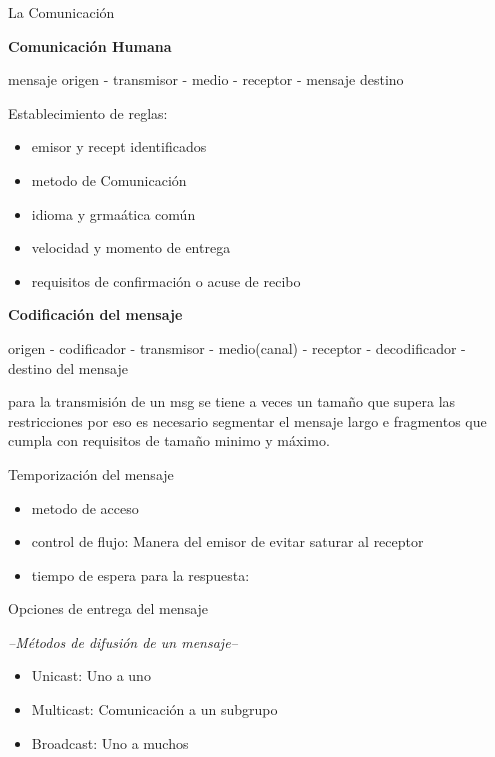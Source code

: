 \documentclass{article}
\begin{document}
\centering
{\Large La Comunicación }
\vspace{1cm}

\textbf{Comunicación Humana}

mensaje origen - transmisor - medio - receptor - mensaje destino \vspace{0.5cm}

\justify
Establecimiento de reglas:
\begin{itemize}
    \item emisor y recept identificados
    \item metodo de Comunicación
    \item idioma y grmaática común
    \item velocidad y momento de entrega
    \item requisitos de confirmación o acuse de recibo
\end{itemize}
\vspace{0.5cm}

\centering
\textbf{Codificación del mensaje}

origen - codificador - transmisor - medio(canal) - receptor - decodificador -
destino del mensaje \vspace{0.5cm}

\justify
para la transmisión de un msg se tiene a veces un tamaño que supera las restricciones
por eso es necesario segmentar el mensaje largo e fragmentos que cumpla con requisitos
de tamaño minimo y máximo.
\vspace{0.5cm}

Temporización del mensaje
\begin{itemize}
    \item metodo de acceso
    \item control de flujo: Manera del emisor de evitar saturar al receptor
    \item tiempo de espera para la respuesta:
\end{itemize}

\vspace{0.5cm}

Opciones de entrega del mensaje

\emph{--Métodos de difusión de un mensaje--}
\begin{itemize}
    \item Unicast: Uno a uno
    \item Multicast: Comunicación a un subgrupo
    \item Broadcast: Uno a muchos
\end{itemize}
\newpage
\end{document}

